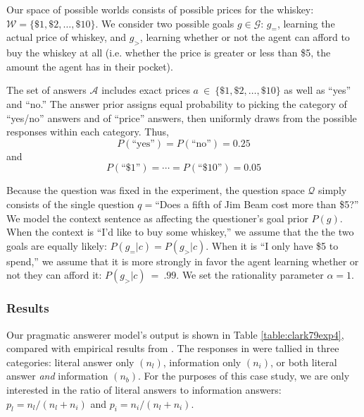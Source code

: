 \documentclass[12pt, floatsintext, jou]{apa6}
\begin{document}
Our space of possible worlds consists of possible prices for the whiskey: $\mathcal{W} = \{\$1, \$2, \dots, \$10\}$. We consider two possible goals $g \in \mathcal{G}$: $g_=$, learning the actual price of whiskey,  and $g_>$, learning whether or not the agent can afford to buy the whiskey at all (i.e. whether the price is greater or less than \$5, the amount the agent has in their pocket). %

The set of answers $\mathcal{A}$ includes exact prices $a~\in~\{\$1, \$2, \dots, \$10\}$ as well as ``yes'' and ``no.'' The answer prior assigns equal probability to picking the category of ``yes/no'' answers and of ``price'' answers, then uniformly draws from the possible responses within each category. Thus, $$P(\textrm{``yes''}) = P(\textrm{``no''}) = 0.25$$ and $$P(\textrm{``\$1''}) = \cdots = P(\textrm{``\$10''}) = 0.05$$

Because the question was fixed in the experiment, the question space $\mathcal{Q}$ simply consists of the single question $q = $``Does a fifth of Jim Beam cost more than \$5?''  We model the context sentence as affecting the questioner's goal prior $P(g)$. When the context is ``I'd like to buy some whiskey,'' we assume that the the two goals are equally likely: $P(g_= | c) = P(g_> | c)$. When it is ``I only have \$5 to spend,'' we assume that it is more strongly in favor the agent learning whether or not they can afford it: $P(g_> | c)~=~.99$. We set the rationality parameter $\alpha = 1$.


\subsubsection{Results} 

Our pragmatic answerer model's output is shown in Table \ref{table:clark79exp4}, compared with empirical results from . The responses in  were tallied in three categories: literal answer only $(n_l)$, information only $(n_i)$, or both literal answer \emph{and} information $(n_b)$. For the purposes of this case study, we are only interested in the ratio of literal answers to information answers: $p_l = n_l/(n_l+n_i)$ and $p_i = n_i/(n_l+n_i)$.
\end{document}
